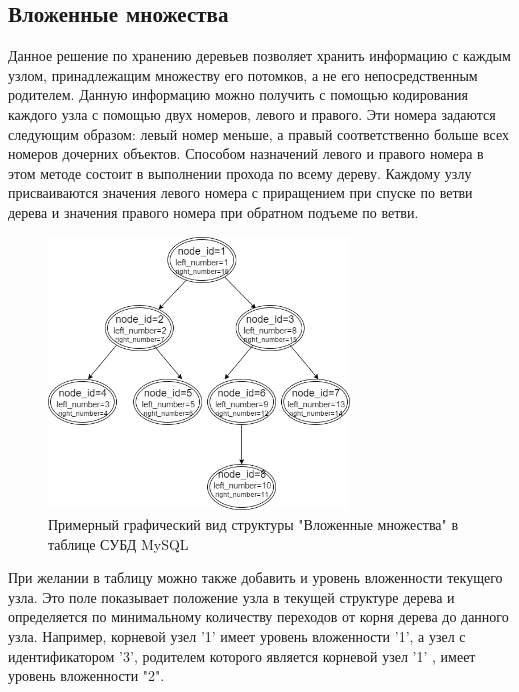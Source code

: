 \documentclass[a4paper,14pt]{extreport}
\theoremstyle{definition}
\begin{document}
\subsection{Вложенные множества}
Данное решение по хранению деревьев позволяет хранить информацию с каждым узлом, принадлежащим множеству его потомков, а не его непосредственным родителем. Данную информацию можно получить с помощью кодирования каждого узла с помощью двух номеров, левого и правого. Эти номера задаются следующим образом: левый номер меньше, а правый соответственно больше всех номеров дочерних объектов. Способом назначений левого и правого номера в этом методе состоит в выполнении прохода по всему дереву. Каждому узлу присваиваются значения левого номера с приращением при спуске по ветви дерева и значения правого номера при обратном подъеме по ветви\cite{Celco}.
\begin{figure}[h!]
\begin{center}
\includegraphics[width=8cm]{13.png}
\caption{Примерный графический вид структуры \newline "Вложенные множества" в таблице СУБД MySQL}
\label{fig:3}
\end{center}
\end{figure}

При желании в таблицу можно также добавить и уровень вложенности текущего узла. Это поле показывает положение узла в текущей структуре дерева и определяется по минимальному количеству переходов от корня дерева до данного узла. Например, корневой узел '1' имеет уровень вложенности '1', а узел с идентификатором '3', родителем которого является корневой узел '1' , имеет уровень вложенности "2".
\end{document}
